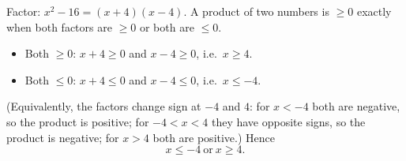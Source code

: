 Factor: $x^2-16=(x+4)(x-4)$. A product of two numbers is $\ge0$ exactly when both factors are $\ge0$ or both are $\le0$.
\begin{itemize}
\item Both $\ge0$: $x+4\ge0$ and $x-4\ge0$, i.e.\ $x\ge4$.
\item Both $\le0$: $x+4\le0$ and $x-4\le0$, i.e.\ $x\le-4$.
\end{itemize}
(Equivalently, the factors change sign at $-4$ and $4$: for $x<-4$ both are negative, so the product is positive; for $-4<x<4$ they have opposite signs, so the product is negative; for $x>4$ both are positive.) Hence
\[
\boxed{x\le-4\ \text{or}\ x\ge4}.
\]
